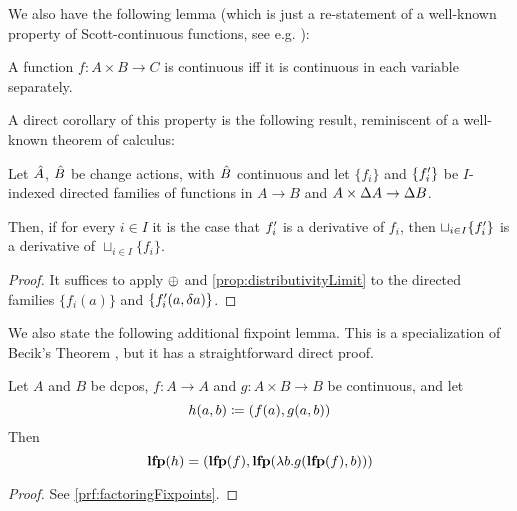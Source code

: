 We also have the following lemma (which is just a re-statement of a well-known
property of Scott-continuous functions, see e.g. \cite[Lemma~3.2.6]{abramsky1994domain}):

\begin{prop}
  \label{prop:distributivityLimit}
  A function $f : A \times B \rightarrow C$ is continuous iff it is continuous in each variable separately.
\end{prop}

A direct corollary of this property is the following result, reminiscent of a well-known theorem of calculus:

\begin{corollary}
  \label{cor:diffContinuous}
  Let $\hat{A}$, $\hat{B}$ be change actions, with $\hat{B}$ continuous and let $\{f_i\}$ and $\{f_i'\}$ be
  $I$-indexed directed families of functions in $A \rightarrow B$ and $A \times \Delta A \rightarrow \Delta B$.

  Then, if for every $i \in I$ it is the case that $f_i'$ is a derivative of $f_i$, then $\sqcup_{i \in I} \{ f_i' \}$ is
  a derivative of $\sqcup_{i \in I} \{ f_i \}$.
\end{corollary}
\ifproofs
\begin{proof}
  It suffices to apply $\oplus$ and \cref{prop:distributivityLimit} to the directed families $\{ f_i(a) \}$ and
  $\{ f_i'(a, \delta a) \}$.
\end{proof}
\fi

We also state the following additional fixpoint lemma. This is a specialization of
Becik's Theorem \autocite[][section 10.1]{winskel1993formal}, but it has a straightforward direct proof.

\begin{prop}[name=Factoring of fixpoints, restate=factoringFixpoints]
  \label{prop:factoringFixpoints}
  Let $A$ and $B$ be dcpos, $f : A \rightarrow A$ and $g: A \times B \rightarrow B$ be continuous, and let
  \begin{displaymath}
    h(a, b) \coloneqq (f(a), g(a, b))
  \end{displaymath}
  Then
  \begin{displaymath}
    \mathbf{lfp}(h) = (\mathbf{lfp}(f), \mathbf{lfp}(\lambda b . g(\mathbf{lfp}(f), b)))
  \end{displaymath}
\end{prop}
\ifproofs
\begin{proof}
  See \cref{prf:factoringFixpoints}.
\end{proof}
\fi

